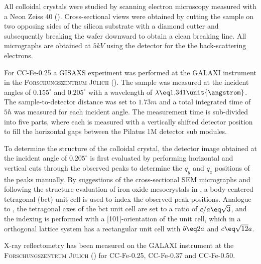 \documentclass[\main/dresen_thesis.tex]{subfiles}
\begin{document}
    All colloidal crystals were studied by scanning electron microscopy measured with a Neon Zeiss 40 ().
    Cross-sectional views were obtained by cutting the sample on two opposing sides of the silicon substrate with a diamond cutter and subsequently breaking the wafer downward to obtain a clean breaking line.
    All micrographs are obtained at $5 \unit{kV}$ using the detector for the the back-scattering electrons.

    For CC-Fe-0.25 a GISAXS experiment was performed at the GALAXI instrument in the \textsc{Forschungszentrum J\"ulich} ().
    The sample was measured at the incident angles of $0.155 ^\circ$ and $0.205 ^\circ$ with a wavelength of $\lambda \eq 1.341 \unit{\angstrom}$.
    The sample-to-detector distance was set to $1.73 \unit{m}$ and a total integrated time of $5 \unit{h}$ was measured for each incident angle.
    The measurement time is sub-divided into five parts, where each is measured with a vertically shifted detector position to fill the horizontal gaps between the Pilatus 1M detector sub modules.

    To determine the structure of the colloidal crystal, the detector image obtained at the incident angle of $0.205 ^\circ$ is first evaluated by performing horizontal and vertical cuts through the observed peaks to determine the $q_y$ and $q_z$ positions of the peaks manually.
    By suggestions of the cross-sectional SEM micrographs and following the structure evaluation of iron oxide mesocrystals in \cite{Wetterskog_2016_Tunin}, a body-centered tetragonal (bct) unit cell is used to index the observed peak positions.
    Analogue to \cite{Wetterskog_2016_Tunin}, the tetragonal axes of the bct unit cell are set to a ratio of $c/a \eq \sqrt{3}$, and the indexing is performed with a [101]-orientation of the unit cell, which in a orthogonal lattice system has a rectangular unit cell with $b \eq 2a$ and $c \eq \sqrt{12} a$.


    X-ray reflectometry has been measured on the GALAXI instrument at the \textsc{Forschungszentrum J\"ulich} () for CC-Fe-0.25, CC-Fe-0.37 and CC-Fe-0.50.
\end{document}
